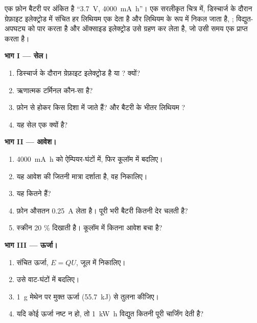 \begin{problem}
\label{pb:g12:cells-and-electrolysis:1}
एक फ़ोन बैटरी पर अंकित है ``\qty{3.7}{V}, \qty{4000}{mA.h}''। एक
सरलीकृत चित्र में, डिस्चार्ज के दौरान ग्रेफ़ाइट इलेक्ट्रोड में संचित हर लिथियम 
एक  देता है और लिथियम  के रूप में निकल जाता है,
;  विद्युत-अपघट्य को पार करता है और
 ऑक्साइड इलेक्ट्रोड उसे ग्रहण कर लेता है, जो उसी समय एक  प्राप्त करता है।

\medskip
\noindent\textbf{भाग I --- सेल।}
\begin{enumerate}
  \item डिस्चार्ज के दौरान ग्रेफ़ाइट इलेक्ट्रोड  है या
        ? क्यों?
  \item ऋणात्मक टर्मिनल कौन-सा है?
  \item {} फ़ोन से होकर किस दिशा में जाते हैं?
        और बैटरी के भीतर लिथियम ?
  \item यह सेल एक  क्यों है?
\end{enumerate}

\medskip
\noindent\textbf{भाग II --- आवेश।}
\begin{enumerate}[resume]
  \item \qty{4000}{mA.h} को ऐम्पियर-घंटों में, फिर कूलॉम में बदलिए।
  \item यह आवेश  की जितनी मात्रा दर्शाता है, वह निकालिए।
  \item यह कितने  हैं?
  \item फ़ोन औसतन \qty{0.25}{A} लेता है। पूरी भरी
        बैटरी कितनी देर चलती है?
  \item स्क्रीन 20 \% दिखाती है। कूलॉम में कितना आवेश बचा है?
\end{enumerate}

\medskip
\noindent\textbf{भाग III --- ऊर्जा।}
\begin{enumerate}[resume]
  \item संचित ऊर्जा, $E = Q U$, जूल में निकालिए।
  \item उसे वाट-घंटों में बदलिए।
  \item \qty{1}{g} मेथेन  पर मुक्त ऊर्जा
        (\qty{55.7}{kJ}) से तुलना कीजिए।
  \item यदि कोई ऊर्जा नष्ट न हो, तो \qty{1}{kW.h} विद्युत कितनी पूरी चार्जिंग देती
        है?
\end{enumerate}


\end{problem}
